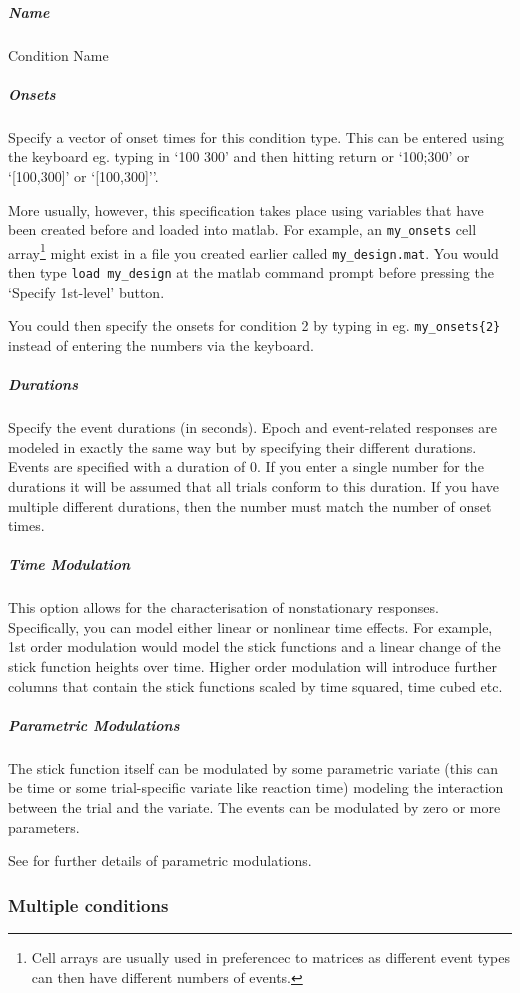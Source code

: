 \subparagraph{Name}
Condition Name


\subparagraph{Onsets}
Specify a vector of onset times for this condition type. 
This can be entered using the keyboard eg. typing in 
`100 300' and then hitting return or `100;300' or 
`[100,300]' or `[100,300]''.

More usually, however, this specification takes place 
using variables that have been created before and loaded into matlab. For example, an \verb!my_onsets! cell array\footnote{Cell arrays are usually used in preferencec to matrices as different event types can then have different numbers of events.} might 
exist in a file you created earlier called \verb!my_design.mat!. You would then type 
\verb!load my_design! at the matlab command prompt before pressing the `Specify 1st-level' button. 

You could then specify the onsets for condition 2 by typing in eg. \verb!my_onsets{2}! instead of entering 
the numbers via the keyboard.
 

\subparagraph{Durations}
Specify the event durations (in seconds). Epoch and event-related responses are modeled in exactly the same way but by specifying their different durations.  Events are specified with a duration of 0.  If you enter a single number for the durations it will be assumed that all trials conform to this duration. If you have multiple different durations, then the number must match the number of onset times.


\subparagraph{Time Modulation}
This option allows for the characterisation of nonstationary responses.  Specifically, you can model either linear or nonlinear time effects. For example, 1st order modulation would model the stick functions and a linear change of the stick function heights over time. Higher order modulation will introduce further columns that contain the stick functions scaled by time squared, time cubed etc.

\subparagraph{Parametric Modulations}
The stick function itself can be modulated by some parametric variate (this can be time or some trial-specific variate like reaction time) modeling the interaction between the trial and the variate. The events can be modulated by zero or more parameters.

See \cite{parametric_pet,parametric_fmri} for further details of 
parametric modulations.

\subsubsection{Multiple conditions}

